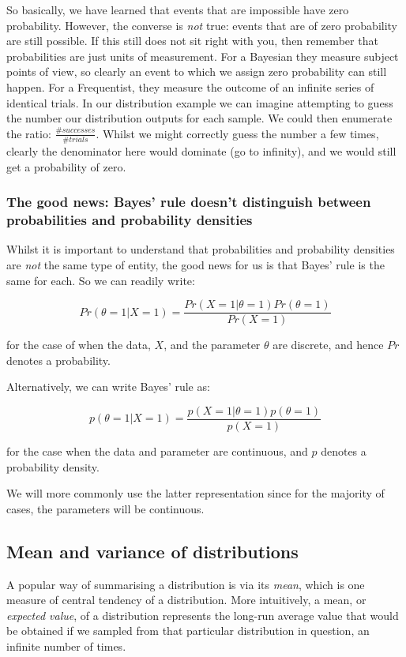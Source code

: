 \documentclass[11pt,fullpage]{book}
\begin{document}
So basically, we have learned that events that are impossible have zero probability. However, the converse is \textit{not} true: events that are of zero probability are still possible. If this still does not sit right with you, then remember that probabilities are just units of measurement. For a Bayesian they measure subject points of view, so clearly an event to which we assign zero probability can still happen. For a Frequentist, they measure the outcome of an infinite series of identical trials. In our distribution example we can imagine attempting to guess the number our distribution outputs for each sample. We could then enumerate the ratio: $\frac{\#successes}{\#trials}$. Whilst we might correctly guess the number a few times, clearly the denominator here would dominate (go to infinity), and we would still get a probability of zero.

\subsubsection{The good news: Bayes' rule doesn't distinguish between probabilities and probability densities}
Whilst it is important to understand that probabilities and probability densities are \textit{not} the same type of entity, the good news for us is that Bayes' rule is the same for each. So we can readily write:

\begin{equation}
Pr(\theta=1|X=1) = \frac{Pr(X=1|\theta=1)Pr(\theta=1)}{Pr(X=1)}
\end{equation}

for the case of when the data, $X$, and the parameter $\theta$ are discrete, and hence $Pr$ denotes a probability.

Alternatively, we can write Bayes' rule as:

\begin{equation}
p(\theta=1|X=1) = \frac{p(X=1|\theta=1)p(\theta=1)}{p(X=1)}
\end{equation}

for the case when the data and parameter are continuous, and $p$ denotes a probability density.

We will more commonly use the latter representation since for the majority of cases, the parameters will be continuous.

\subsection{Mean and variance of distributions}\label{sec:Probability_meanVariance}
A popular way of summarising a distribution is via its \textit{mean}, which is one measure of central tendency of a distribution. More intuitively, a mean, or \textit{expected value}, of a distribution represents the long-run average value that would be obtained if we sampled from that particular distribution in question, an infinite number of times. 
\end{document}
